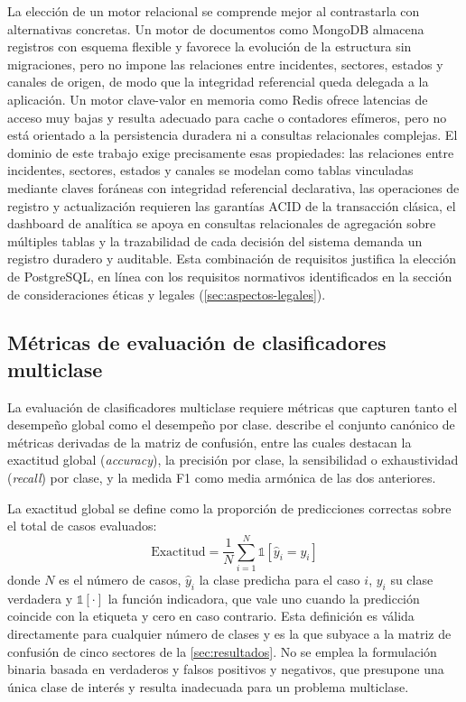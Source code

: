 La elección de un motor relacional se comprende mejor al contrastarla con alternativas concretas. Un motor de documentos como MongoDB almacena registros con esquema flexible y favorece la evolución de la estructura sin migraciones, pero no impone las relaciones entre incidentes, sectores, estados y canales de origen, de modo que la integridad referencial queda delegada a la aplicación. Un motor clave-valor en memoria como Redis ofrece latencias de acceso muy bajas y resulta adecuado para cache o contadores efímeros, pero no está orientado a la persistencia duradera ni a consultas relacionales complejas. El dominio de este trabajo exige precisamente esas propiedades: las relaciones entre incidentes, sectores, estados y canales se modelan como tablas vinculadas mediante claves foráneas con integridad referencial declarativa, las operaciones de registro y actualización requieren las garantías ACID de la transacción clásica, el dashboard de analítica se apoya en consultas relacionales de agregación sobre múltiples tablas y la trazabilidad de cada decisión del sistema demanda un registro duradero y auditable. Esta combinación de requisitos justifica la elección de PostgreSQL, en línea con los requisitos normativos identificados en la sección de consideraciones éticas y legales (\autoref{sec:aspectos-legales}).

\subsection{Métricas de evaluación de clasificadores multiclase}
\label{sec:metricas-multiclase}

La evaluación de clasificadores multiclase requiere métricas que capturen tanto el desempeño global como el desempeño por clase. \textcite{Powers2011_evaluation} describe el conjunto canónico de métricas derivadas de la matriz de confusión, entre las cuales destacan la exactitud global (\emph{accuracy}), la precisión por clase, la sensibilidad o exhaustividad (\emph{recall}) por clase, y la medida F1 como media armónica de las dos anteriores.

La exactitud global se define como la proporción de predicciones correctas sobre el total de casos evaluados:
\[
\text{Exactitud} = \frac{1}{N} \sum_{i=1}^{N} \mathbb{1}[\hat{y}_{i} = y_{i}]
\]
donde \(N\) es el número de casos, \(\hat{y}_{i}\) la clase predicha para el caso \(i\), \(y_{i}\) su clase verdadera y \(\mathbb{1}[\cdot]\) la función indicadora, que vale uno cuando la predicción coincide con la etiqueta y cero en caso contrario. Esta definición es válida directamente para cualquier número de clases y es la que subyace a la matriz de confusión de cinco sectores de la \autoref{sec:resultados}. No se emplea la formulación binaria basada en verdaderos y falsos positivos y negativos, que presupone una única clase de interés y resulta inadecuada para un problema multiclase.

